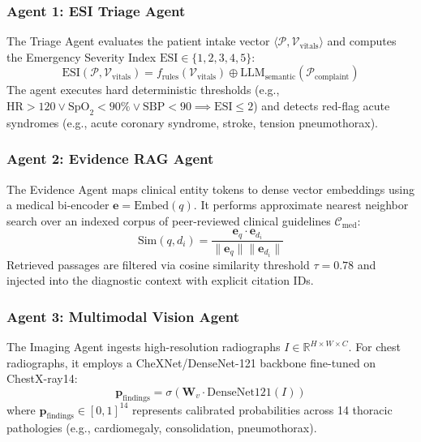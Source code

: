 \documentclass[conference]{IEEEtran}
\begin{document}
\subsubsection{Agent 1: ESI Triage Agent}
The Triage Agent evaluates the patient intake vector $\langle \mathcal{P}, \mathcal{V}_{\text{vitals}} \rangle$ and computes the Emergency Severity Index $\text{ESI} \in \{1, 2, 3, 4, 5\}$:
\begin{equation}
\text{ESI}(\mathcal{P}, \mathcal{V}_{\text{vitals}}) = f_{\text{rules}}(\mathcal{V}_{\text{vitals}}) \oplus \text{LLM}_{\text{semantic}}(\mathcal{P}_{\text{complaint}})
\end{equation}
The agent executes hard deterministic thresholds (e.g., $\text{HR} > 120 \lor \text{SpO}_2 < 90\% \lor \text{SBP} < 90 \implies \text{ESI} \le 2$) and detects red-flag acute syndromes (e.g., acute coronary syndrome, stroke, tension pneumothorax).

\subsubsection{Agent 2: Evidence RAG Agent}
The Evidence Agent maps clinical entity tokens to dense vector embeddings using a medical bi-encoder $\mathbf{e} = \text{Embed}(q)$. It performs approximate nearest neighbor search over an indexed corpus of peer-reviewed clinical guidelines $\mathcal{C}_{\text{med}}$:
\begin{equation}
\text{Sim}(q, d_i) = \frac{\mathbf{e}_q \cdot \mathbf{e}_{d_i}}{\|\mathbf{e}_q\| \|\mathbf{e}_{d_i}\|}
\end{equation}
Retrieved passages are filtered via cosine similarity threshold $\tau = 0.78$ and injected into the diagnostic context with explicit citation IDs.

\subsubsection{Agent 3: Multimodal Vision Agent}
The Imaging Agent ingests high-resolution radiographs $I \in \mathbb{R}^{H \times W \times C}$. For chest radiographs, it employs a CheXNet/DenseNet-121 backbone fine-tuned on ChestX-ray14:
\begin{equation}
\mathbf{p}_{\text{findings}} = \sigma(\mathbf{W}_v \cdot \text{DenseNet121}(I))
\end{equation}
where $\mathbf{p}_{\text{findings}} \in [0, 1]^{14}$ represents calibrated probabilities across 14 thoracic pathologies (e.g., cardiomegaly, consolidation, pneumothorax).
\end{document}
